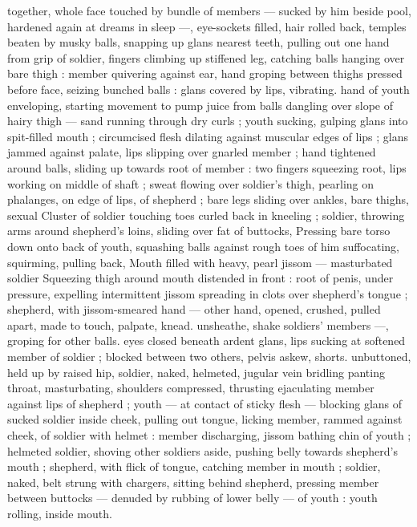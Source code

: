 {together, whole face touched by bundle of members --- sucked by 
him beside pool, hardened again at dreams in sleep ---, eye-sockets 
filled, hair rolled back, temples beaten by musky balls, snapping up 
glans nearest teeth, pulling out one hand from grip of soldier, fingers 
climbing up stiffened leg, catching balls hanging over bare thigh : 
member quivering against ear, hand groping between thighs pressed 
before face, seizing bunched balls : glans covered by lips, vibrating. 
hand of youth enveloping, starting movement to pump juice from 
balls dangling over slope of hairy thigh --- sand running through dry 
curls ; youth sucking, gulping glans into spit-filled mouth ; 
circumcised flesh dilating against muscular edges of lips ; glans 
jammed against palate, lips slipping over gnarled member ; hand 
tightened around balls, sliding up towards root of member : two 
fingers squeezing root, lips working on middle of shaft ; sweat 
flowing over soldier's thigh, pearling on phalanges, on edge of lips, 
of shepherd ; bare legs sliding over ankles, bare thighs, sexual 
Cluster of soldier touching toes curled back in kneeling ; soldier, 
throwing arms around shepherd's loins, sliding over fat of buttocks, 
Pressing bare torso down onto back of youth, squashing balls 
against rough toes of him suffocating, squirming, pulling back, 
Mouth filled with heavy, pearl jissom --- masturbated soldier 
Squeezing thigh around mouth distended in front : root of penis, 
under pressure, expelling intermittent jissom spreading in clots over 
shepherd's tongue ; shepherd, with jissom-smeared hand --- other 
hand, opened, crushed, pulled apart, made to touch, palpate, knead. 
unsheathe, shake soldiers' members ---, groping for other balls. 
eyes closed beneath ardent glans, lips sucking at softened member 
of soldier ; blocked between two others, pelvis askew, shorts. 
unbuttoned, held up by raised hip, soldier, naked, helmeted, jugular 
vein bridling panting throat, masturbating, shoulders compressed, 
thrusting ejaculating member against lips of shepherd ; youth --- at 
contact of sticky flesh --- blocking glans of sucked soldier inside 
cheek, pulling out tongue, licking member, rammed against cheek, of 
soldier with helmet : member discharging, jissom bathing chin of 
youth ; helmeted soldier, shoving other soldiers aside, pushing belly 
towards shepherd's mouth ; shepherd, with flick of tongue, catching 
member in mouth ; soldier, naked, belt strung with chargers, sitting 
behind shepherd, pressing member between buttocks --- denuded 
by rubbing of lower belly --- of youth : youth rolling, inside mouth. 
}
